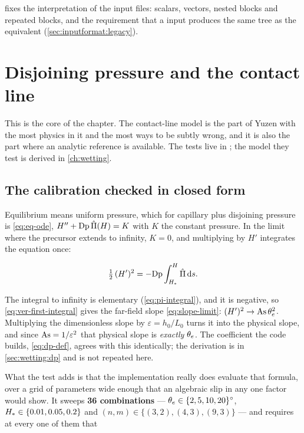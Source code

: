  fixes the interpretation of the input files: scalars,
vectors, nested blocks and repeated blocks, and the requirement that a
 input produces the same tree as the equivalent
 (\cref{sec:inputformat:legacy}).

\section{Disjoining pressure and the contact line}
\label{sec:verification:disjoining}

This is the core of the chapter. The contact-line model is the part of Yuzen
with the most physics in it and the most ways to be subtly wrong, and it is
also the part where an analytic reference is available. The tests live in
; the model they test is derived in
\cref{ch:wetting}.

\subsection{The calibration checked in closed form}

Equilibrium means uniform pressure, which for capillary plus disjoining
pressure is \cref{eq:eq-ode}, $H'' + \mathrm{Dp}\,\hat{\Pi}(H) = K$ with $K$ the constant
pressure. In the limit where the precursor extends to infinity, $K = 0$, and
multiplying by $H'$ integrates the equation once:

\begin{equation}\label{eq:ver-first-integral}
  \tfrac{1}{2}\,(H')^{2} = -\mathrm{Dp} \int_{H_{*}}^{H} \hat{\Pi}\,\mathrm{d}s .
\end{equation}

The integral to infinity is elementary (\cref{eq:pi-integral}), and it is
negative, so \cref{eq:ver-first-integral} gives the far-field slope
\cref{eq:slope-limit}: $(H')^{2} \to \mathrm{As}\,\theta_{e}^{2}$. Multiplying the
dimensionless slope by $\varepsilon = h_0/L_0$ turns it into the physical
slope, and since $\mathrm{As} = 1/\varepsilon^{2}$ that physical slope is
\emph{exactly} $\theta_{e}$. The coefficient the code builds,
\cref{eq:dp-def}, agrees with this identically; the derivation is in
\cref{sec:wetting:dp} and is not repeated here.

What the test adds is that the implementation really does evaluate that
formula, over a grid of parameters wide enough that an algebraic slip in any
one factor would show. It sweeps \textbf{36 combinations} ---
$\theta_{e} \in \{2, 5, 10, 20\}^{\circ}$, $H_{*} \in \{0.01, 0.05, 0.2\}$ and
$(n,m) \in \{(3,2), (4,3), (9,3)\}$ --- and requires at every one of them that

